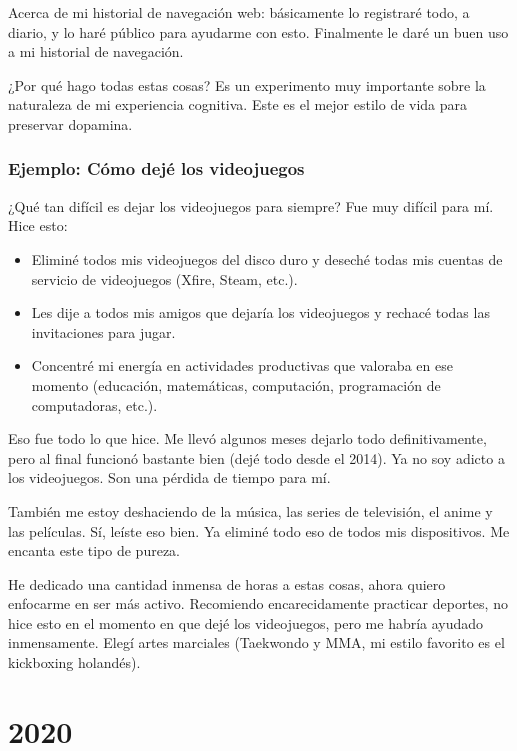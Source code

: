 \documentclass[12pt]{article}
\begin{document}
	Acerca de mi historial de navegación web: básicamente lo registraré
	todo, a diario, y lo haré público para ayudarme con esto. Finalmente le
	daré un buen uso a mi historial de navegación.

	¿Por qué hago todas estas cosas? Es un experimento muy importante sobre
	la naturaleza de mi experiencia cognitiva. Este es el mejor estilo de
	vida para preservar dopamina.

	\subsubsection*{Ejemplo: Cómo dejé los videojuegos}

	¿Qué tan difícil es dejar los videojuegos para siempre? Fue muy difícil
	para mí. Hice esto:

	\begin{itemize}
	\item Eliminé todos mis videojuegos del disco duro y deseché todas mis
	cuentas de servicio de videojuegos (Xfire, Steam, etc.).
	\item Les dije a todos mis amigos que dejaría los videojuegos y rechacé
	todas las invitaciones para jugar.
	\item Concentré mi energía en actividades productivas que valoraba en
	ese momento (educación, matemáticas, computación, programación de
	computadoras, etc.).
	\end{itemize}

	Eso fue todo lo que hice. Me llevó algunos meses dejarlo todo
	definitivamente, pero al final funcionó bastante bien (dejé todo desde
	el 2014). Ya no soy adicto a los videojuegos. Son una pérdida de
	tiempo para mí.

	También me estoy deshaciendo de la música, las series de televisión, el
	anime y las películas. Sí, leíste eso bien. Ya eliminé todo eso de todos
	mis dispositivos. Me encanta este tipo de pureza.

	He dedicado una cantidad inmensa de horas a estas cosas, ahora quiero
	enfocarme en ser más activo. Recomiendo encarecidamente practicar
	deportes, no hice esto en el momento en que dejé los videojuegos, pero
	me habría ayudado inmensamente. Elegí artes marciales (Taekwondo y MMA,
	mi estilo favorito es el kickboxing holandés).

	\newpage

	\section{2020}
\end{document}
